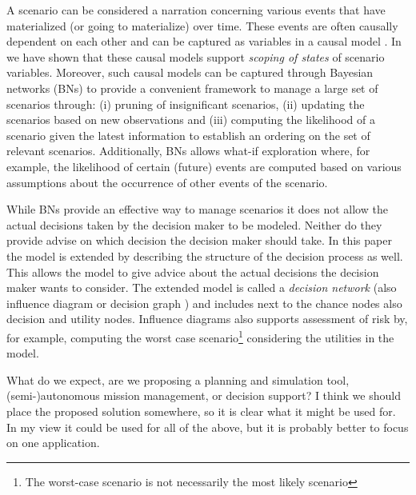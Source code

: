 \documentclass[conference]{IEEEtran}
\begin{document}
A scenario can be considered a narration concerning various events that have materialized (or going to materialize) over time. These events are often causally dependent on each other and can be captured as variables in a causal model \cite{pearl00book}. In \cite{conrado14if} we have shown that these causal models support {\em scoping of states} of scenario variables. Moreover, such causal models can be captured through Bayesian networks (BNs) \cite{pearl88book, jensen07book} to provide a convenient framework to manage a large set of scenarios through: (i) pruning of insignificant scenarios, (ii) updating the scenarios based on new observations and (iii) computing the likelihood of a scenario given the latest information to establish an ordering on the set of relevant scenarios. Additionally, BNs allows what-if exploration where, for example, the likelihood of certain (future) events are computed based on various assumptions about the occurrence of other events of the scenario.

While BNs provide an effective way to manage scenarios it does not allow the actual decisions taken by the decision maker to be modeled. Neither do they provide advise on which decision the decision maker should take. In this paper the model is extended by describing the structure of the decision process as well. This allows the model to give advice about the actual decisions the decision maker wants to consider. The extended model is called a {\em decision network} \cite{russell02bn} (also influence diagram or decision graph \cite{jensen07book}) and includes next to the chance nodes also decision and utility nodes. Influence diagrams also supports assessment of risk by, for example, computing the worst case scenario\footnote{The worst-case scenario is not necessarily the most likely scenario} considering the utilities in the model.

{\red What do we expect, are we proposing a planning and simulation tool, (semi-)autonomous mission management, or decision support? I think we should place the proposed solution somewhere, so it is clear what it might be used for. In my view it could be used for all of the above, but it is probably better to focus on one application.}

\end{document}
